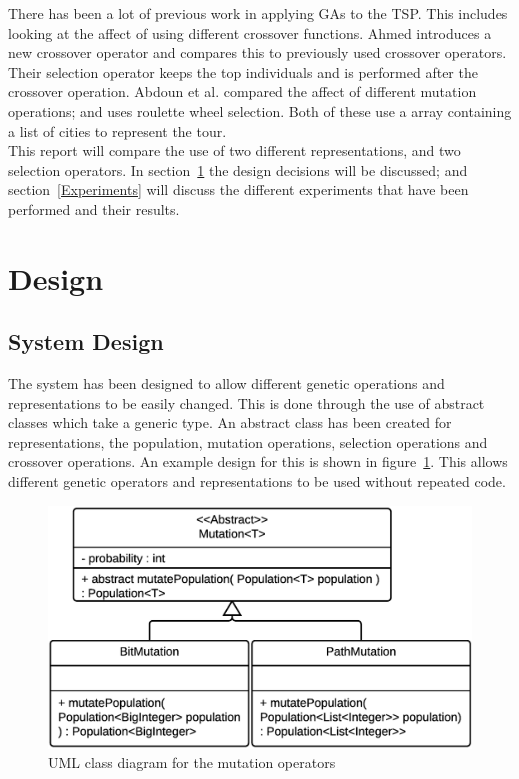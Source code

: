\documentclass[10pt,a4paper,openbib]{article}
\begin{document}
\begin{multicols}{2}
\noindent There has been a lot of previous work in applying GAs to the TSP. This includes looking at the affect of using different crossover functions. Ahmed \cite{ahmed2010genetic} introduces a new crossover operator and compares this to previously used crossover operators. Their selection operator keeps the top individuals and is performed after the crossover operation. Abdoun et al. \cite{abdoun2012analyzing} compared the affect of different mutation operations; and uses roulette wheel selection. Both of these use a array containing a list of cities to represent the tour. \\

\noindent This report will compare the use of two different representations, and two selection operators. In section~\ref{design} the design decisions will be discussed; and section~\ref{Experiments} will discuss the different experiments that have been performed and their results.

\section{Design} \label{design}

\subsection{System Design}

The system has been designed to allow different genetic operations and representations to be easily changed. This is done through the use of abstract classes which take a generic type. An abstract class has been created for representations, the population, mutation operations, selection operations and crossover operations.  An example design for this is shown in figure~\ref{fig:classDiagram}. This allows different genetic operators and representations to be used without repeated code. \\

\begin{figure}[H]
\begin{center}
\includegraphics[scale=0.8]{images/classDiagram.png} 
\caption{UML class diagram for  the mutation operators}
\label{fig:classDiagram}
\end{center}
\end{figure}


\end{multicols}
\end{document}
